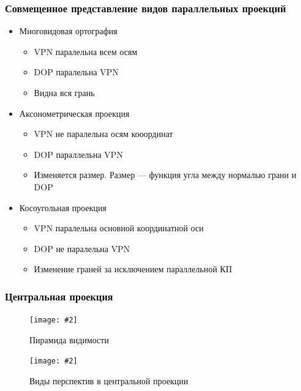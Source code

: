 \documentclass[a4paper, 14pt]{extarticle}
\newcommand{\screenshot}[3]{
	\begin{figure}[h]
		\centering
		\texttt{[image: \#2]}
		\caption{#3}
	\end{figure}
}
\begin{document}
\subsubsection{Совмещенное представление видов параллельных проекций}
\begin{itemize}
	\item Многовидовая ортография
	\begin{itemize}
		\item VPN паралельна всем осям
		\item DOP паралельна VPN
		\item Видна вся грань
	\end{itemize}
	\item Аксонометрическая проекция
	\begin{itemize}
		\item VPN не паралельна осям кооординат
		\item DOP параллельна VPN
		\item Изменяется размер. Размер — функция угла между нормалью грани и DOP
	\end{itemize} 
	\item Косоугольная проекция
	\begin{itemize}
		\item VPN паралельна основной координатной оси
		\item DOP не паралельна VPN
		\item Изменение граней за исключением параллельной КП
	\end{itemize}
\end{itemize}

\subsubsection{Центральная проекция}
\screenshot{width=\textwidth}{l5/S041.jpg}{Пирамида видимости}
\screenshot{width=\textwidth}{l5/S042.jpg}{Виды перспектив в центральной проекции}
\end{document}
